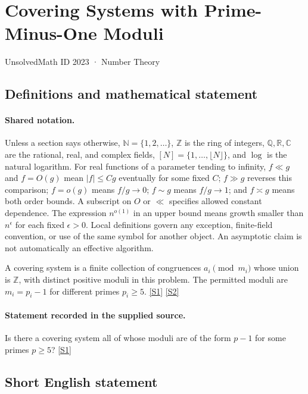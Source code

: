 \documentclass[11pt,a4paper]{article}
\newcommand{\N}{\mathbb{N}}
\newcommand{\Z}{\mathbb{Z}}
\newcommand{\Q}{\mathbb{Q}}
\newcommand{\R}{\mathbb{R}}
\newcommand{\C}{\mathbb{C}}
\newcommand{\sref}[2]{\hyperlink{source:#1:#2}{[S#2]}}
\begin{document}

\setcounter{section}{2022}

\section{Covering Systems with Prime-Minus-One Moduli}\label{2023}

{\small\sffamily UnsolvedMath ID 2023 · Number Theory}

\subsection{Definitions and mathematical statement}

\paragraph{Shared notation.}Unless a section says otherwise, $\N=\{1,2,\ldots\}$,
$\Z$ is the ring of integers, $\Q,\R,\C$ are the rational, real, and complex
fields, $[N]=\{1,\ldots,\lfloor N\rfloor\}$, and $\log$ is the natural
logarithm. For real functions of a parameter tending to infinity,
$f\ll g$ and $f=O(g)$ mean $|f|\leq Cg$ eventually for some fixed $C$;
$f\gg g$ reverses this comparison; $f=o(g)$ means $f/g\to0$;
$f\sim g$ means $f/g\to1$; and $f\asymp g$ means both order bounds.
A subscript on $O$ or $\ll$ specifies allowed constant dependence.
The expression $n^{o(1)}$ in an upper bound means growth smaller than
$n^\epsilon$ for each fixed $\epsilon>0$. Local definitions govern any
exception, finite-field convention, or use of the same symbol for another
object. An asymptotic claim is not automatically an effective algorithm.



A covering system is a finite collection of congruences $a_i\pmod{m_i}$ whose union is $\Z$, with distinct positive moduli in this problem. The permitted moduli are $m_i=p_i-1$ for different primes $p_i\geq5$. \sref{2023}{1} \sref{2023}{2}

\paragraph{Statement recorded in the supplied source.}
Is there a covering system all of whose moduli are of the form $p-1$ for some primes $p\geq 5$? \sref{2023}{1}

\subsection{Short English statement}
\end{document}
